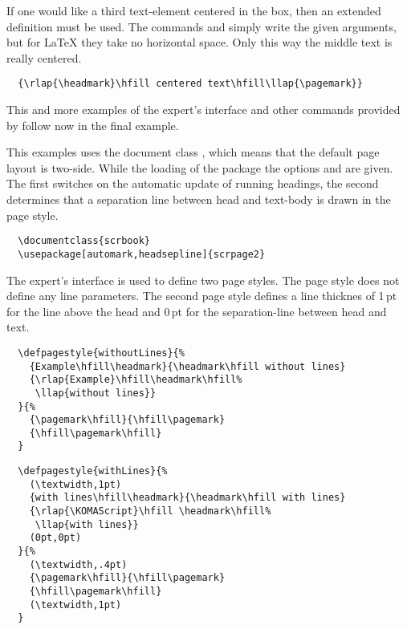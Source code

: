 If one would like a third text-element centered in the box, then an
extended definition must be used.
The commands  and  simply write the given
arguments, but for \LaTeX{} they take no horizontal space.
Only this way the middle text is really centered.
%
\begin{lstlisting}
  {\rlap{\headmark}\hfill centered text\hfill\llap{\pagemark}}
\end{lstlisting}

This and more examples of the expert's interface and other commands
provided by  follow now in the final example.

\begin{Example}
This examples uses the document class , which
means that the default page layout is two-side.
While the loading of the package  the
options  and  are
given.
The first switches on the automatic update of running
headings, the second determines that a separation line between
head and text-body is drawn in the  page style.

\begin{lstlisting}
  \documentclass{scrbook}
  \usepackage[automark,headsepline]{scrpage2}
\end{lstlisting}

The expert's interface is used to define two page styles.
The page style  does not define any 
line parameters.
The second page style  defines
a line thicknes of 1\,pt for the line above the head
and 0\,pt for the separation-line between head and text.

\begin{lstlisting}
  \defpagestyle{withoutLines}{%
    {Example\hfill\headmark}{\headmark\hfill without lines}
    {\rlap{Example}\hfill\headmark\hfill%
     \llap{without lines}}
  }{%
    {\pagemark\hfill}{\hfill\pagemark}
    {\hfill\pagemark\hfill}
  }
\end{lstlisting}

\begin{lstlisting}
  \defpagestyle{withLines}{%
    (\textwidth,1pt)
    {with lines\hfill\headmark}{\headmark\hfill with lines}
    {\rlap{\KOMAScript}\hfill \headmark\hfill%
     \llap{with lines}}
    (0pt,0pt)
  }{%
    (\textwidth,.4pt)
    {\pagemark\hfill}{\hfill\pagemark}
    {\hfill\pagemark\hfill}
    (\textwidth,1pt)
  }
\end{lstlisting}


\end{Example}
